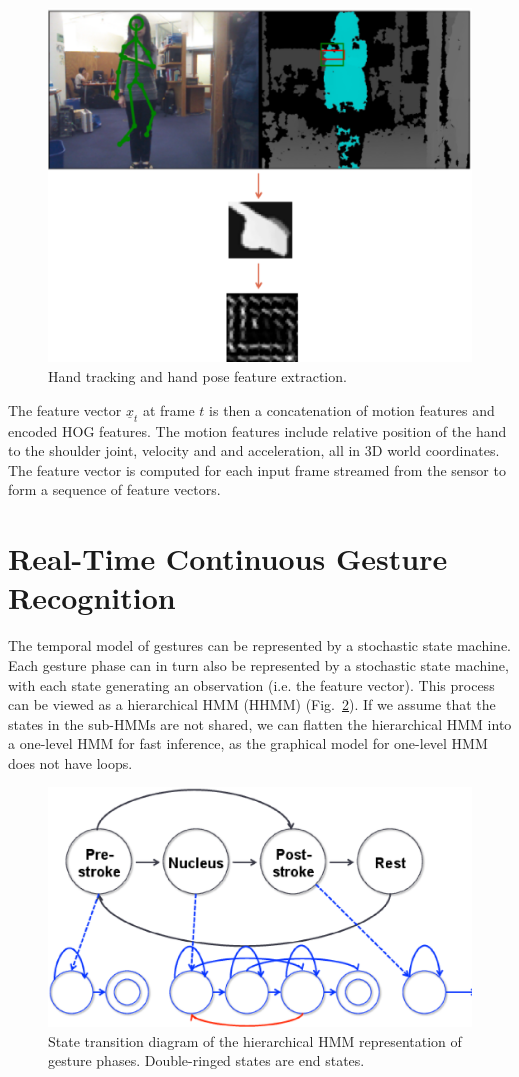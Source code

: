 \documentclass[conference]{IEEEtran}
\begin{document}
\begin{figure}[!t]
\centering
\includegraphics[width=0.8\columnwidth]{fig/hand_tracking.ps}
\caption{Hand tracking and hand pose feature extraction.}
\label{fig:tracking}
\end{figure}

The feature vector $\underline{x}_t$ at frame $t$ is then a concatenation of motion features and encoded HOG features. The
motion features include relative position of the hand to the shoulder joint,
velocity and and acceleration, all in 3D world coordinates. The feature vector
is computed for each input frame streamed from the sensor to form a sequence of
feature vectors.

\section{Real-Time Continuous Gesture Recognition}
The temporal model of gestures can be represented by a stochastic state machine.
Each gesture phase can in turn also be represented by a stochastic state
machine, with each state generating an observation (i.e. the feature vector).
This process can be viewed as a hierarchical HMM (HHMM) (Fig.~\ref{fig:hhmm}). If we assume
that the states in the sub-HMMs are not shared, we can flatten the hierarchical
HMM into a one-level HMM for fast inference, as the graphical model for one-level
HMM does not have loops.

\begin{figure}[!t]
\centering
\includegraphics[width=0.7\columnwidth]{fig/hhmm.ps}
\caption{State transition diagram of the hierarchical HMM representation of
gesture phases. Double-ringed states are end states.}
\label{fig:hhmm}
\end{figure}
\end{document}
